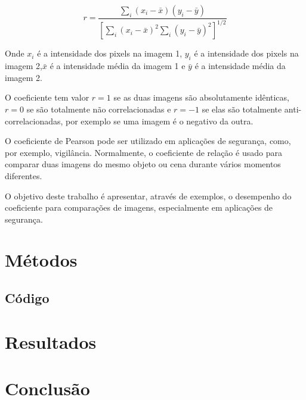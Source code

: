 \documentclass[10pt,a4paper]{article}
\begin{document}
\begin{equation}r = \frac{  
\displaystyle{\sum_{i} (x_i-\bar{x})(y_i-  
\bar{y})}}{\displaystyle{\left[  
\sum_{i}(x_i-\bar{x})^2  
\sum_{i}(y_i-\bar{y})^2\right]^{1/2}}}  
\end{equation}  

Onde $x_i$ é a intensidade dos pixels na imagem 1, $y_i$ é a
intensidade dos pixels na imagem 2,$\bar{x}$ é a intensidade média da
imagem 1 e $\bar{y}$ é a intensidade média da imagem 2.

O coeficiente tem valor $r=1$ se as duas imagens são absolutamente
idênticas, $r=0$ se são totalmente não correlacionadas e $r=-1$ se elas
são totalmente anti-correlacionadas, por exemplo se uma imagem é o
negativo da outra.

O coeficiente de Pearson pode ser utilizado em
aplicações de segurança, como, por exemplo, vigilância. Normalmente, 
o coeficiente de relação é usado para comparar duas imagens do mesmo
objeto ou cena durante vários momentos diferentes.

O objetivo deste trabalho é apresentar, através de exemplos, o
desempenho do coeficiente para comparações de imagens, especialmente
em aplicações de segurança.

\section{Métodos}



\subsection{Código}

\section{Resultados}

\section{Conclusão}


\begin{small}
  
\end{small}
\end{document}
